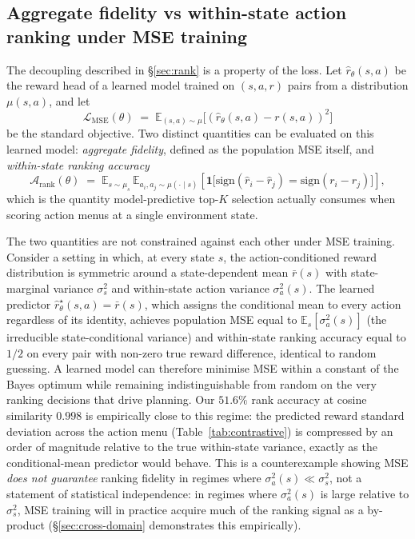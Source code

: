 \documentclass[11pt]{article}
\begin{document}
\subsection{Aggregate fidelity vs within-state action ranking under MSE training}\label{sec:methods-fidelity-vs-ranking}

The decoupling described in \S\ref{sec:rank} is a property of the loss. Let $\hat{r}_\theta(s, a)$ be the reward head of a learned model trained on $(s, a, r)$ pairs from a distribution $\mu(s, a)$, and let
\begin{equation}
\mathcal{L}_{\text{MSE}}(\theta) \;=\; \mathbb{E}_{(s,a)\sim\mu}\big[(\hat{r}_\theta(s,a) - r(s,a))^2\big]
\end{equation}
be the standard objective. Two distinct quantities can be evaluated on this learned model: \emph{aggregate fidelity}, defined as the population MSE itself, and \emph{within-state ranking accuracy}
\begin{equation}
\mathcal{A}_{\text{rank}}(\theta) \;=\; \mathbb{E}_{s\sim\mu_s}\,\mathbb{E}_{a_i,a_j\sim\mu(\cdot \mid s)}\!\left[\mathbf{1}\big[\mathrm{sign}(\hat{r}_i - \hat{r}_j) = \mathrm{sign}(r_i - r_j)\big]\right],
\end{equation}
which is the quantity model-predictive top-$K$ selection actually consumes when scoring action menus at a single environment state.

The two quantities are not constrained against each other under MSE training. Consider a setting in which, at every state $s$, the action-conditioned reward distribution is symmetric around a state-dependent mean $\bar{r}(s)$ with state-marginal variance $\sigma_s^2$ and within-state action variance $\sigma_a^2(s)$. The learned predictor $\hat{r}_\theta^{\star}(s,a) = \bar{r}(s)$, which assigns the conditional mean to every action regardless of its identity, achieves population MSE equal to $\mathbb{E}_s[\sigma_a^2(s)]$ (the irreducible state-conditional variance) and within-state ranking accuracy equal to $1/2$ on every pair with non-zero true reward difference, identical to random guessing. A learned model can therefore minimise MSE within a constant of the Bayes optimum while remaining indistinguishable from random on the very ranking decisions that drive planning. Our $51.6\%$ rank accuracy at cosine similarity $0.998$ is empirically close to this regime: the predicted reward standard deviation across the action menu (Table~\ref{tab:contrastive}) is compressed by an order of magnitude relative to the true within-state variance, exactly as the conditional-mean predictor would behave. This is a counterexample showing MSE \emph{does not guarantee} ranking fidelity in regimes where $\sigma_a^2(s) \ll \sigma_s^2$, not a statement of statistical independence: in regimes where $\sigma_a^2(s)$ is large relative to $\sigma_s^2$, MSE training will in practice acquire much of the ranking signal as a by-product (\S\ref{sec:cross-domain} demonstrates this empirically).
\end{document}
